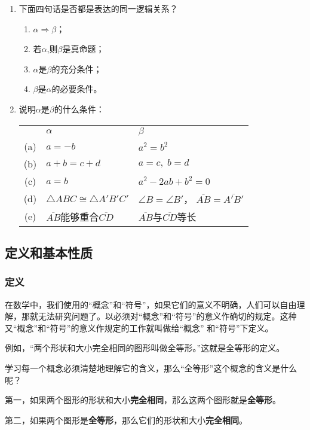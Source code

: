 \begin{ex}
\begin{enumerate}
    \item 下面四句话是否都是表达的同一逻辑关系？
    \begin{enumerate}
        \item $\alpha\Rightarrow\beta$；
        \item 若$\alpha$,则$\beta$是真命题；
        \item $\alpha$是$\beta$的充分条件；
        \item $\beta$是$\alpha$的必要条件。
    \end{enumerate}

\item 说明$\alpha$是$\beta$的什么条件：

\begin{tabular}{cll}
& $\alpha$ &$\beta$\\
(a)& $a=-b$ &$a^2=b^2$\\
(b)& $a+b=c+d$ & $a=c,\; b=d$\\
(c)& $a=b$ & $a^2-2ab+b^2=0$\\
(d)& $\triangle ABC\cong \triangle A'B'C'$ & $\angle B=\angle B'$，
$\overline{AB}=\overline{A'B'}$\\
(e)&  $\overline{AB}$能够重合$\overline{CD}$
& $\overline{AB}$与$\overline{CD}$等长
\end{tabular}
\end{enumerate}
\end{ex}

\subsection{定义和基本性质}
\subsubsection{定义}
在数学中，我们使用的“概念”和“符号”，如果它们的意义不明确，人们可以自由理解，那就无法研究问题了。以必须对“概念”和“符号”的意义作确切的规定。这种又“概念”和“符号”的意义作规定的工作就叫做给“概念”
和“符号”下定义。

例如，“两个形状和大小完全相同的图形叫做全等形。”这就是全等形的定义。

学习每一个概念必须清楚地理解它的含义，那么“全等形”这个概念的含义是什么呢？

第一，如果两个图形的形状和大小\textbf{完全相同}，那么这两个图形就是\textbf{全等形}。

第二，如果两个图形是\textbf{全等形}，那么它们的形状和大小\textbf{完全相同}。

